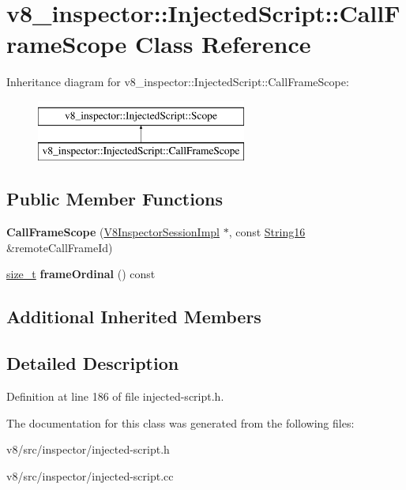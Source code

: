 \hypertarget{classv8__inspector_1_1InjectedScript_1_1CallFrameScope}{}\section{v8\+\_\+inspector\+:\+:Injected\+Script\+:\+:Call\+Frame\+Scope Class Reference}
\label{classv8__inspector_1_1InjectedScript_1_1CallFrameScope}
Inheritance diagram for v8\+\_\+inspector\+:\+:Injected\+Script\+:\+:Call\+Frame\+Scope\+:\begin{figure}[H]
\begin{center}
\leavevmode
\includegraphics[height=2.000000cm]{classv8__inspector_1_1InjectedScript_1_1CallFrameScope}
\end{center}
\end{figure}
\subsection*{Public Member Functions}
\begin{DoxyCompactItemize}
\item 
\mbox{\label{classv8__inspector_1_1InjectedScript_1_1CallFrameScope_ac731956f2553542a1b6cf2ba4a319498}} 
{\bfseries Call\+Frame\+Scope} (\mbox{\hyperlink{classv8__inspector_1_1V8InspectorSessionImpl}{V8\+Inspector\+Session\+Impl}} $\ast$, const \mbox{\hyperlink{classv8__inspector_1_1String16}{String16}} \&remote\+Call\+Frame\+Id)
\item 
\mbox{\label{classv8__inspector_1_1InjectedScript_1_1CallFrameScope_a7741d835b00455460014190df34f2c0c}} 
\mbox{\hyperlink{classsize__t}{size\+\_\+t}} {\bfseries frame\+Ordinal} () const
\end{DoxyCompactItemize}
\subsection*{Additional Inherited Members}


\subsection{Detailed Description}


Definition at line 186 of file injected-\/script.\+h.



The documentation for this class was generated from the following files\+:\begin{DoxyCompactItemize}
\item 
v8/src/inspector/injected-\/script.\+h\item 
v8/src/inspector/injected-\/script.\+cc\end{DoxyCompactItemize}
